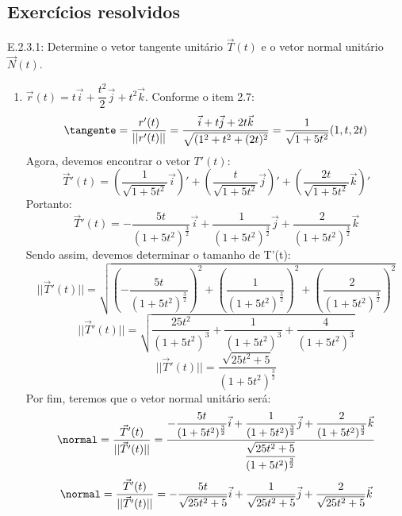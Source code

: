 \subsection*{Exercícios resolvidos}
E.2.3.1: Determine o vetor tangente unitário $\vec T(t)$ e o vetor normal unitário $\vec N(t)$.
\begin{enumerate}
	\item $\vec r(t)=t\vec i+\dfrac{t^2}{2}\vec j+t^2\vec k$. Conforme o item 2.7:
\begin{equation*}
	\tangente=\dfrac{r'(t)}{\vert\vert r'(t)\vert\vert}=\dfrac{\vec i+t\vec j+2t\vec k}{\sqrt{(1^2+t^2+(2t)^2}}=\dfrac{1}{\sqrt{1+5t^2}}(1, t, 2t)
\end{equation*}
Agora, devemos encontrar o vetor $T'(t)$:
\begin{equation*}
 	\vec T'(t)=\left(\dfrac{1}{\sqrt{1+5t^2}}\vec i\right)'+\left(\dfrac{t}{\sqrt{1+5t^2}}\vec j\right)'+\left(\dfrac{2t}{\sqrt{1+5t^2}}\vec k\right)'
\end{equation*}
Portanto:
\begin{equation*}
	\vec T'(t)=-\dfrac{5t}{(1+5t^2)^\frac{3}{2}}\vec i+\dfrac{1}{(1+5t^2)^\frac{3}{2}}\vec j+\dfrac{2}{(1+5t^2)^\frac{3}{2}}\vec k
\end{equation*}
Sendo assim, devemos determinar o tamanho de T'(t):
\begin{equation*}
	\vert\vert \vec T'(t)\vert\vert=\sqrt{\left(-\dfrac{5t}{(1+5t^2)^\frac{3}{2}}\right)^2+\left(\dfrac{1}{(1+5t^2)^\frac{3}{2}}\right)^2+\left(\dfrac{2}{(1+5t^2)^\frac{3}{2}}\right)^2}
\end{equation*}
\begin{equation*}
	\vert\vert \vec T'(t)\vert\vert=\sqrt{\dfrac{25t^2}{(1+5t^2)^3}+\dfrac{1}{(1+5t^2)^3}+\dfrac{4}{(1+5t^2)^3}}
\end{equation*}
\begin{equation*}
	\vert\vert \vec T'(t)\vert\vert=\dfrac{\sqrt{25t^2+5}}{(1+5t^2)^\frac{3}{2}}
\end{equation*}
Por fim, teremos que o vetor normal unitário será:
\begin{equation*}
	\normal=\dfrac{\vec T'(t)}{\vert\vert \vec T'(t)\vert\vert}=\dfrac{-\dfrac{5t}{(1+5t^2)^\frac{3}{2}}\vec i+\dfrac{1}{(1+5t^2)^\frac{3}{2}}\vec j+\dfrac{2}{(1+5t^2)^\frac{3}{2}}\vec k}{\dfrac{\sqrt{25t^2+5}}{(1+5t^2)^\frac{3}{2}}}
\end{equation*}
\begin{equation*}
	\normal=\dfrac{\vec T'(t)}{\vert\vert \vec T'(t)\vert\vert}=-\dfrac{5t}{\sqrt{25t^2+5}}\vec i+\dfrac{1}{\sqrt{25t^2+5}}\vec j+\dfrac{2}{\sqrt{25t^2+5}}\vec k
\end{equation*}


\end{enumerate}
